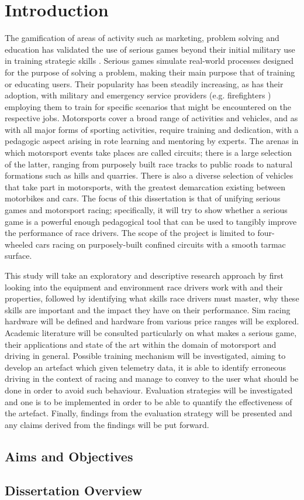 \chapter{Introduction}

The gamification of areas of activity such as marketing, problem solving and education \cite{michael2005serious} has validated the use of serious games beyond their initial military use in training strategic skills \cite{djaouti2011classifying}.  Serious games simulate real-world processes designed for the purpose of solving a problem, making their main purpose that of training or educating users. Their popularity has been steadily increasing, as has their adoption, with military \cite{djaouti2011classifying} and emergency service providers (e.g. firefighters \cite{michael2005serious}) employing them to train for specific scenarios that might be encountered on the respective jobs. Motorsports cover a broad range of activities and vehicles, and as with all major forms of sporting activities, require training and dedication, with a pedagogic aspect arising in rote learning and mentoring by experts. The arenas in which motorsport events take places are called circuits; there is a large selection of the latter, ranging from purposely built race tracks to public roads to natural formations such as hills and quarries. There is also a diverse selection of vehicles that take part in motorsports, with the greatest demarcation existing between motorbikes and cars. The focus of this dissertation is that of unifying serious games and motorsport racing; specifically, it will try to show whether a serious game is a powerful enough pedagogical tool that can be used to tangibly improve the performance of race drivers. The scope of the project is limited to four-wheeled cars racing on purposely-built confined circuits with a smooth tarmac surface.  

This study will take an exploratory and descriptive research approach by first looking into the equipment and environment race drivers work with and their properties, followed by identifying what skills race drivers must master, why these skills are important and the impact they have on their performance. Sim racing hardware will be defined and hardware from various price ranges will be explored. Academic literature will be consulted particularly on what makes a serious game, their applications and state of the art within the domain of motorsport and driving in general. Possible training mechanism will be investigated, aiming to develop an artefact which given telemetry data, it is able to identify erroneous driving in the context of racing and manage to convey to the user what should be done in order to avoid such behaviour.  Evaluation strategies will be investigated and one is to be implemented in order to be able to quantify the effectiveness of the artefact. Finally, findings from the evaluation strategy will be presented and any claims derived from the findings will be put forward.

\section{Aims and Objectives}
\section{Dissertation Overview}